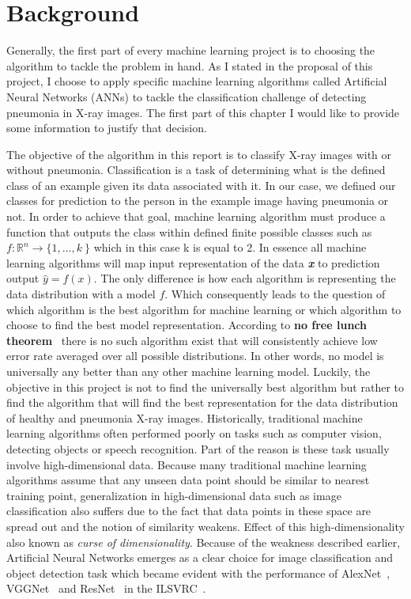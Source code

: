 \chapter{Background} \label{chap:background}
Generally, the first part of every machine learning project is to choosing the algorithm to tackle the problem in hand. As I stated in the proposal of this project, I choose to apply specific machine learning algorithms called Artificial Neural Networks (ANNs) to tackle the classification challenge of detecting pneumonia in X-ray images. The first part of this chapter I would like to provide some information to justify that decision. 

The objective of the algorithm in this report is to classify X-ray images with or without pneumonia. Classification is a task of determining what is the defined class of an example given its data associated with it. In our case, we defined our classes for prediction to the person in the example image having pneumonia or not. In order to achieve that goal, machine learning algorithm must produce a function that outputs the class within defined finite possible classes such as \(f:\mathbb{R}^n \rightarrow \{1, \ldots, k\ \}\) which in this case k is equal to 2. In essence all machine learning algorithms will map input representation of the data \textbf{\textit{x}} to prediction output $\hat{y}=f(x)$. The only difference is how each algorithm is representing the data distribution with a model $f$. Which consequently leads to the question of which algorithm is the best algorithm for machine learning or which algorithm to choose to find the best model representation. According to \textbf{no free lunch theorem}~\cite{nofreelunch} there is no such algorithm exist that will consistently achieve low error rate averaged over all possible distributions. In other words, no model is universally any better than any other machine learning model. Luckily, the objective in this project is not to find the universally best algorithm but rather to find the algorithm that will find the best representation for the data distribution of healthy and pneumonia X-ray images. 
Historically, traditional machine learning algorithms often performed poorly on tasks such as computer vision, detecting objects or speech recognition. Part of the reason is these task usually involve high-dimensional data. Because many traditional machine learning algorithms assume that any unseen data point should be similar to nearest training point, generalization in high-dimensional data such as image classification also suffers due to the fact that data points in these space are spread out and the notion of similarity weakens. Effect of this high-dimensionality also known as \emph{curse of dimensionality}.
Because of the weakness described earlier, Artificial Neural Networks emerges as a clear choice for image classification and object detection task which became evident with the performance of AlexNet~\cite{Alexnet}, VGGNet~\cite{vggnet} and ResNet~\cite{resnet} in the ILSVRC~\cite{imagenet}.  


